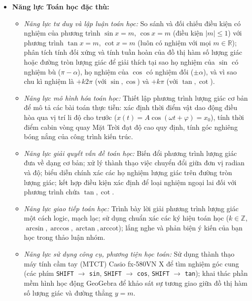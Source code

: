 \documentclass[12pt, a4paper]{article}
\begin{document}
\begin{itemize}[leftmargin=1.2cm]
    \item \textbf{Năng lực Toán học đặc thù:}  
    \begin{itemize}[leftmargin=0.6cm]  
        \item \textit{Năng lực tư duy và lập luận toán học:} So sánh và đối chiếu điều kiện có nghiệm của phương trình $\sin x = m$, $\cos x = m$ (điều kiện $|m| \le 1$) với phương trình $\tan x = m$, $\cot x = m$ (luôn có nghiệm với mọi $m \in \mathbb{R}$); phân tích tính đối xứng và tính tuần hoàn của đồ thị hàm số lượng giác hoặc đường tròn lượng giác để giải thích tại sao họ nghiệm của $\sin$ có nghiệm bù ($\pi - \alpha$), họ nghiệm của $\cos$ có nghiệm đối ($\pm\alpha$), và vì sao chu kì nghiệm là $+ k2\pi$ (với $\sin, \cos$) và $+ k\pi$ (với $\tan, \cot$).  
        \item \textit{Năng lực mô hình hóa toán học:} Thiết lập phương trình lượng giác cơ bản để mô tả các bài toán thực tiễn: xác định thời điểm vật dao động điều hòa qua vị trí li độ cho trước ($x(t) = A\cos(\omega t + \varphi) = x_0$), tính thời điểm cabin vòng quay Mặt Trời đạt độ cao quy định, tính góc nghiêng bóng nắng của công trình kiến trúc.  
        \item \textit{Năng lực giải quyết vấn đề toán học:} Biến đổi phương trình lượng giác đưa về dạng cơ bản; xử lý thành thạo việc chuyển đổi giữa đơn vị radian và độ; biểu diễn chính xác các họ nghiệm lượng giác trên đường tròn lượng giác; kết hợp điều kiện xác định để loại nghiệm ngoại lai đối với phương trình chứa $\tan, \cot$.  
        \item \textit{Năng lực giao tiếp toán học:} Trình bày lời giải phương trình lượng giác một cách logic, mạch lạc; sử dụng chuẩn xác các ký hiệu toán học ($k \in \mathbb{Z}$, $\arcsin, \arccos, \arctan, \text{arccot}$); lắng nghe và phản biện ý kiến của bạn học trong thảo luận nhóm.  
        \item \textit{Năng lực sử dụng công cụ, phương tiện học toán:} Sử dụng thành thạo máy tính cầm tay (MTCT) Casio fx-580VN X để tìm nghiệm góc cung (các phím \texttt{SHIFT} $\to$ \texttt{sin}, \texttt{SHIFT} $\to$ \texttt{cos}, \texttt{SHIFT} $\to$ \texttt{tan}); khai thác phần mềm hình học động GeoGebra để khảo sát sự tương giao giữa đồ thị hàm số lượng giác và đường thẳng $y = m$.  
    \end{itemize}  
  

\end{itemize}
\end{document}
